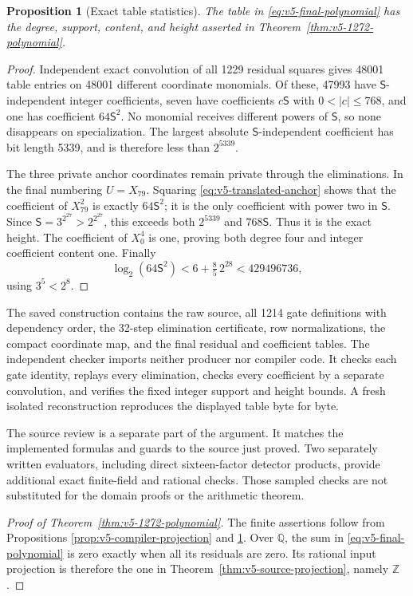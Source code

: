 \documentclass[11pt]{article}
\newtheorem{proposition}[theorem]{Proposition}
\theoremstyle{definition}
\theoremstyle{remark}
\newcommand{\Q}{\mathbb Q}
\newcommand{\Z}{\mathbb Z}
\begin{document}
\begin{proposition}[Exact table statistics]\label{prop:v5-table-statistics}
The table in \eqref{eq:v5-final-polynomial} has the degree, support,
content, and height asserted in Theorem~\ref{thm:v5-1272-polynomial}.
\end{proposition}
\begin{proof}
Independent exact convolution of all 1229 residual squares gives
48001 table entries on 48001 different coordinate monomials.
Of these, 47993 have $\mathsf S$-independent integer coefficients,
seven have coefficients $c\mathsf S$ with $0<|c|\le768$, and one
has coefficient $64\mathsf S^2$. No monomial receives different
powers of $\mathsf S$, so none disappears on specialization.
The largest absolute $\mathsf S$-independent coefficient has bit
length 5339, and is therefore less than $2^{5339}$.

The three private anchor coordinates remain private through the
eliminations. In the final numbering $U=X_{79}$. Squaring
\eqref{eq:v5-translated-anchor} shows that the coefficient of
$X_{79}^2$ is exactly $64\mathsf S^2$; it is the only coefficient
with power two in $\mathsf S$. Since
$\mathsf S=3^{2^{27}}>2^{2^{27}}$, this exceeds both
$2^{5339}$ and $768\mathsf S$. Thus it is the exact height.
The coefficient of $X_0^4$ is one, proving both degree four and
integer coefficient content one. Finally
\[
 \log_2(64\mathsf S^2)<6+\tfrac85\,2^{28}<429496736,
\]
using $3^5<2^8$.
\end{proof}

The saved construction contains the raw source, all 1214 gate
definitions with dependency order, the 32-step elimination
certificate, row normalizations, the compact coordinate map,
and the final residual and coefficient tables. The independent
checker imports neither producer nor compiler code. It checks
each gate identity, replays every elimination, checks every
coefficient by a separate convolution, and verifies the fixed
integer support and height bounds. A fresh isolated reconstruction
reproduces the displayed table byte for byte.

The source review is a separate part of the argument. It matches
the implemented formulas and guards to the source just proved.
Two separately written evaluators, including direct sixteen-factor
detector products, provide additional exact finite-field and
rational checks. Those sampled checks are not substituted for
the domain proofs or the arithmetic theorem.

\begin{proof}[Proof of Theorem~\ref{thm:v5-1272-polynomial}]
The finite assertions follow from Propositions
\ref{prop:v5-compiler-projection} and \ref{prop:v5-table-statistics}.
Over $\Q$, the sum in \eqref{eq:v5-final-polynomial} is zero
exactly when all its residuals are zero. Its rational input
projection is therefore the one in
Theorem~\ref{thm:v5-source-projection}, namely $\Z$.
\end{proof}
\end{document}
